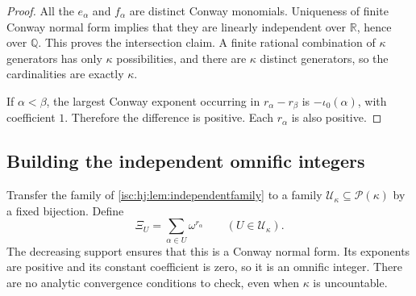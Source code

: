 \documentclass[11pt,letterpaper]{article}
\newtheorem{lemma}[theorem]{Lemma}
\theoremstyle{definition}
\theoremstyle{remark}
\newcommand{\R}{\mathbb R}
\newcommand{\Q}{\mathbb Q}
\newcommand{\Span}{\operatorname{span}_{\Q}}
\numberwithin{equation}{section}
\begin{document}
\begin{proof}
All the $e_\alpha$ and $f_\alpha$ are distinct Conway monomials.
Uniqueness of finite Conway normal form implies that they are linearly
independent over $\R$, hence over $\Q$. This proves the intersection
claim. A finite rational combination of $\kappa$ generators has only
$\kappa$ possibilities, and there are $\kappa$ distinct generators, so
the cardinalities are exactly $\kappa$.

If $\alpha<\beta$, the largest Conway exponent occurring in
$r_\alpha-r_\beta$ is $-\iota_0(\alpha)$, with coefficient $1$.
Therefore the difference is positive. Each $r_\alpha$ is also positive.
\end{proof}

\subsection{Building the independent omnific integers}

Transfer the family of \cref{isc:hj:lem:independentfamily} to a family
$\mathcal U_\kappa\subseteq\mathcal P(\kappa)$ by a fixed bijection. Define
\begin{equation}\label{isc:hj:eq:cardwitness}
 \Xi_U=\sum_{\alpha\in U}\omega^{r_\alpha}
 \qquad(U\in\mathcal U_\kappa).
\end{equation}
The decreasing support ensures that this is a Conway normal form. Its
exponents are positive and its constant coefficient is zero, so it is an
omnific integer. There are no analytic convergence conditions to check,
even when $\kappa$ is uncountable.
\end{document}
